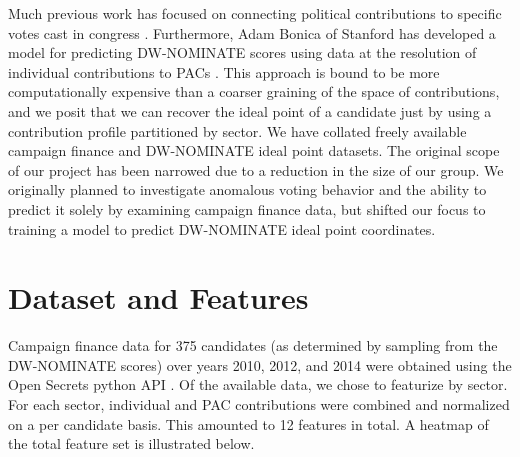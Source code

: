 \documentclass[12]{article}
\begin{document}
\noindent Much previous work has focused on connecting political contributions to specific votes cast in congress \cite{stratmann1991campaign,stratmann1995campaign}. Furthermore, Adam Bonica of Stanford has developed a model for predicting DW-NOMINATE scores using data at the resolution of individual contributions to PACs \cite{bonica2013ideology}. This approach is bound to be more computationally expensive than a coarser graining of the space of contributions, and we posit that we can recover the ideal point of a candidate just by using a contribution profile partitioned by sector. We have collated freely available campaign finance \cite{open_secrets} and DW-NOMINATE ideal point \cite{DWWEB} datasets. The original scope of our project has been narrowed due to a reduction in the size of our group. We originally planned to investigate anomalous voting behavior and the ability to predict it solely by examining campaign finance data, but shifted our focus to training a model to predict DW-NOMINATE ideal point coordinates.\\

\section*{Dataset and Features}

\noindent Campaign finance data for 375 candidates (as determined by sampling from
the DW-NOMINATE scores) over years 2010, 2012, and 2014 were obtained using the 
Open Secrets python API \cite{open_secrets}. Of the available data, we chose to 
featurize by sector. For each sector, individual and PAC contributions were 
combined and normalized on a per candidate basis. This amounted to 12 features in total. A heatmap of the total feature 
set is illustrated below.\\ 
\end{document}
